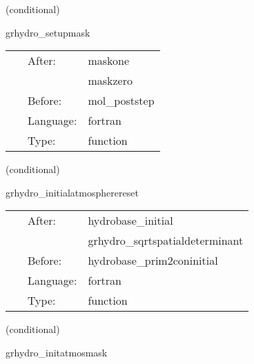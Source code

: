 \vspace{5mm}

   (conditional) 

\hspace{5mm} grhydro\_setupmask 

\hspace{5mm}{\it initialize the atmosphere mask } 


\hspace{5mm}

 \begin{tabular*}{160mm}{cll} 
~ & After:  & maskone \\ 
~& ~ &maskzero\\ 
~ & Before:  & mol\_poststep \\ 
~ & Language:  & fortran \\ 
~ & Type:  & function \\ 
\end{tabular*} 


\vspace{5mm}

   (conditional) 

\hspace{5mm} grhydro\_initialatmospherereset 

\hspace{5mm}{\it use mask to enforce atmosphere at initial time } 


\hspace{5mm}

 \begin{tabular*}{160mm}{cll} 
~ & After:  & hydrobase\_initial \\ 
~& ~ &grhydro\_sqrtspatialdeterminant\\ 
~ & Before:  & hydrobase\_prim2coninitial \\ 
~ & Language:  & fortran \\ 
~ & Type:  & function \\ 
\end{tabular*} 


\vspace{5mm}

   (conditional) 

\hspace{5mm} grhydro\_initatmosmask 

\hspace{5mm}{\it set the atmosphere mask } 


\hspace{5mm}

